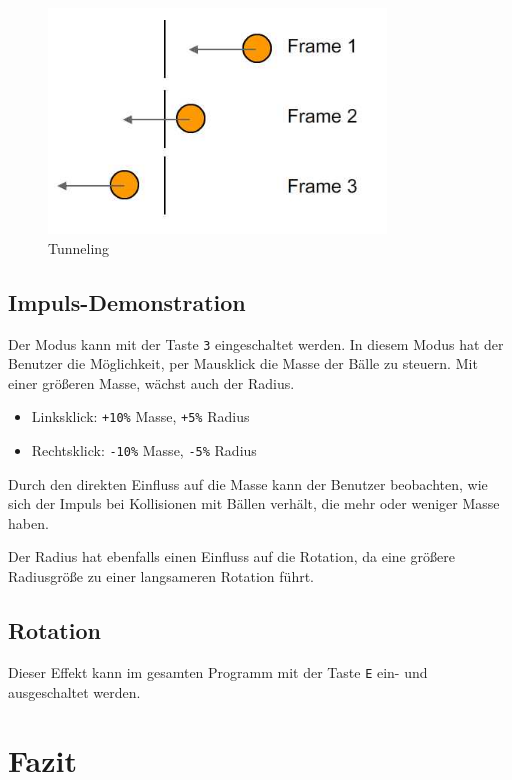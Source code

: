 \documentclass[12pt,a4paper]{article}
\begin{document}
	\begin{figure}[H]
		\centering 
		\includegraphics[width=0.8\textwidth]{tunneling.jpg}  
		\caption{Tunneling  \cite{tunneling_example}} 
		\label{Bild: Beispiel Tunneling}  
	\end{figure}
	
	
	\subsection{Impuls-Demonstration}
	
	Der Modus kann mit der Taste \texttt{3} eingeschaltet werden. 
	In diesem Modus hat der Benutzer die Möglichkeit, per Mausklick die Masse der Bälle zu steuern. 
	Mit einer größeren Masse, wächst auch der Radius. 
\begin{itemize}
	\item Linksklick: \texttt{+10\%} Masse, \texttt{+5\%} Radius  
	\item Rechtsklick: \texttt{-10\%} Masse, \texttt{-5\%} Radius  
\end{itemize}

Durch den direkten Einfluss auf die Masse kann der Benutzer beobachten, wie sich der Impuls bei Kollisionen mit Bällen verhält, die mehr oder weniger Masse haben.  

Der Radius hat ebenfalls einen Einfluss auf die Rotation, da eine größere Radiusgröße zu einer langsameren Rotation führt.

	
	
	\subsection{Rotation}
	
Dieser Effekt kann im gesamten Programm mit der Taste \texttt{E} ein- und ausgeschaltet werden.
	
	\section{Fazit}
	
\end{document}
